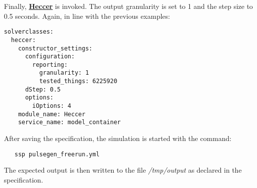 \documentclass[12pt]{article}
\begin{document}
Finally, \href{../heccer/heccer.tex}{\bf Heccer} is invoked. The output granularity is set to 1 and the step size to 0.5 seconds. Again, in line with the previous examples:
\begin{verbatim}
solverclasses:
  heccer:
    constructor_settings:
      configuration:
        reporting:
          granularity: 1
          tested_things: 6225920
      dStep: 0.5
      options:
        iOptions: 4
    module_name: Heccer
    service_name: model_container
\end{verbatim}
After saving the specification, the simulation is started with the command:
\begin{verbatim}
   ssp pulsegen_freerun.yml
\end{verbatim}
The expected output is then written to the file {\it /tmp/output} as declared in the specification. 
\end{document}

